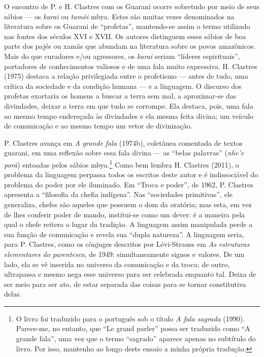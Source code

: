 O encontro de P. e H. Clastres com os Guarani ocorre sobretudo por meio
de seus sábios --- os \emph{karai} ou \emph{tamõi} mbya. Estes são
muitas vezes denominados na literatura sobre os Guarani de ``profetas'',
mantendo-se assim o termo utilizado nas fontes dos séculos XVI e XVII.
Os autores distinguem esses sábios de boa parte dos pajés ou xamãs que
abundam na literatura sobre os povos amazônicos. Mais do que curadores
e/ou agressores, os \emph{karai} seriam ``líderes espirituais'',
portadores de conhecimentos valiosos e de uma fala muito expressiva. H.
Clastres (1975) destaca a relação privilegiada entre o profetismo ---
antes de tudo, uma crítica da sociedade e da condição humana --- e a
linguagem. O discurso dos profetas exortaria os homens a buscar a terra
sem mal, a aproximar-se das divindades, deixar a terra em que tudo se
corrompe. Ela destaca, pois, uma fala ao mesmo tempo endereçada às
divindades e ela mesma feita divina; um veículo de comunicação e ao
mesmo tempo um vetor de divinização.

P. Clastres avança em \emph{A grande fala} (1974b), coletânea comentada
de textos guarani, em uma reflexão sobre essa fala divina --- as ``belas
palavras'' (\emph{nhe'e porã}) entoadas pelos sábios mbya.\footnote{O
  livro foi traduzido para o português sob o título \emph{A fala
  sagrada} (1990). Parece-me, no entanto, que ``Le grand parler'' possa
  ser traduzido como ``A grande fala'', uma vez que o termo ``sagrado''
  aparece apenas no subtítulo do livro. Por isso, mantenho ao longo
  deste ensaio a minha própria tradução.} Como bem lembra H. Clastres
(2011), o problema da linguagem perpassa todos os escritos deste autor e
é indissociável do problema do poder por ele iluminado. Em ``Troca e
poder'', de 1962, P. Clastres apresenta a ``filosofia da chefia
indígena''. Nas ``sociedades primitivas'', ele generaliza, chefes são
aqueles que possuem o dom da oratória; mas esta, em vez de lhes conferir
poder de mando, institui-se como um dever: é a maneira pela qual o chefe
reitera o lugar da tradição. A linguagem assim manipulada perde a sua
função de comunicação e revela sua ``dupla natureza''. A linguagem
seria, para P. Clastres, como os cônjuges descritos por Lévi-Strauss em
\emph{As estruturas elementares do parentesco}, de 1949: simultaneamente
signos e valores. De um lado, ela se vê inserida no universo da
comunicação e da troca; de outro, ultrapassa e mesmo nega esse universo
para ser celebrada enquanto tal. Deixa de ser meio para ser ato, de
estar separada das coisas para se tornar constitutiva delas.

